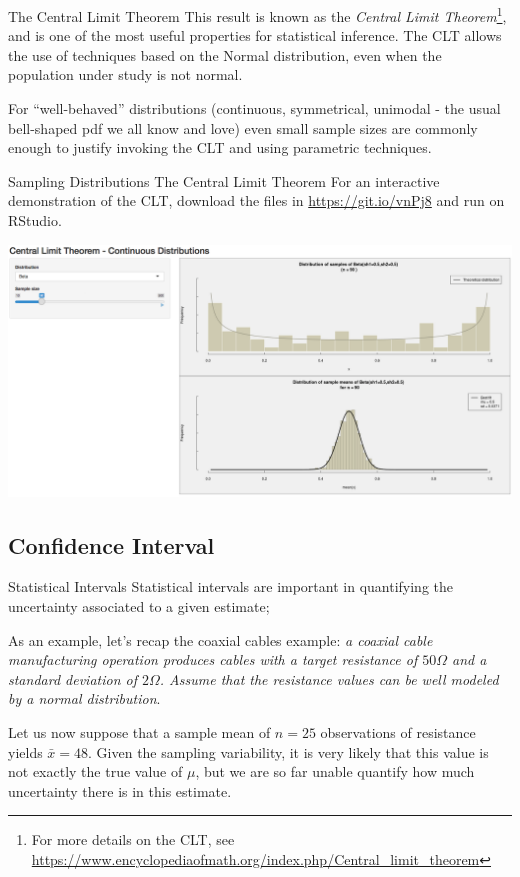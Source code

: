 \begin{frame}
{The Central Limit Theorem}
This result is known as the \textit{Central Limit Theorem}\footnote{For more details on the CLT, see \url{https://www.encyclopediaofmath.org/index.php/Central_limit_theorem}}, and is one of the most useful properties for statistical inference. The CLT allows the use of techniques based on the Normal distribution, even when the population under study is not normal.\bigskip

For ``well-behaved'' distributions (continuous, symmetrical, unimodal - the usual bell-shaped pdf we all know and love) even small sample sizes are commonly enough to justify invoking the CLT and using parametric techniques.\bigskip
\end{frame}

\begin{frame}
{Sampling Distributions}
{The Central Limit Theorem}
For an interactive demonstration of the CLT, download the files in {\small\url{https://git.io/vnPj8}} and run on RStudio.
\bigskip

{\centering\includegraphics[width=\textwidth]{../img/CLTdemo.png}}
\end{frame}

\subsection{Confidence Interval}

\begin{frame}{Statistical Intervals}
Statistical intervals are important in quantifying the uncertainty associated to a given estimate;
\bigskip

As an example, let's recap the coaxial cables example: \textit{a coaxial cable manufacturing operation produces cables with a target resistance of $50\Omega$ and a standard deviation of $2\Omega$. Assume that the resistance values can be well modeled by a normal distribution}.
\bigskip

Let us now suppose that a sample mean of $n=25$ observations of resistance  yields $\bar{x} = 48$. Given the sampling variability, it is very likely that this value is not exactly the true value of $\mu$, but we are so far unable quantify how much uncertainty there is in this estimate.
\end{frame}

